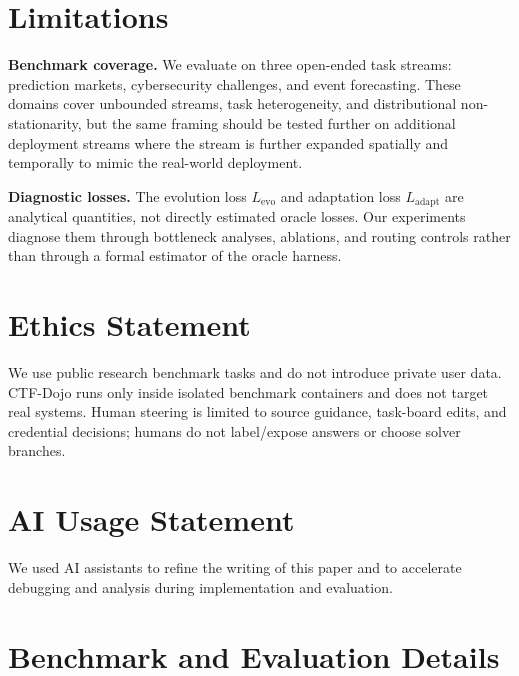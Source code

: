 \documentclass[11pt]{article}
\theoremstyle{plain}
\newcommand{\Levo}{L_{\text{evo}}}
\newcommand{\Ladapt}{L_{\text{adapt}}}
\begin{document}
\section{Limitations}
\label{sec:limitations}

\noindent\textbf{Benchmark coverage.}
We evaluate on three open-ended task streams: prediction markets, cybersecurity challenges, and event forecasting. These domains cover unbounded streams, task heterogeneity, and distributional non-stationarity, but the same framing should be tested further on additional deployment streams where the stream is further expanded spatially and temporally to mimic the real-world deployment.

\noindent\textbf{Diagnostic losses.}
The evolution loss $\Levo$ and adaptation loss $\Ladapt$ are analytical quantities, not directly estimated oracle losses. Our experiments diagnose them through bottleneck analyses, ablations, and routing controls rather than through a formal estimator of the oracle harness.




\section{Ethics Statement}
\label{sec:ethics}

We use public research benchmark tasks and do not introduce private user data. CTF-Dojo runs only inside isolated benchmark containers and does not target real systems. Human steering is limited to source guidance, task-board edits, and credential decisions; humans do not label/expose answers or choose solver branches.




\section{AI Usage Statement}
\label{sec:ai-usage}

We used AI assistants to refine the writing of this paper and to accelerate debugging and analysis during implementation and evaluation.




\appendix



\clearpage
\section{Benchmark and Evaluation Details}
\label{app:benchmarks}
\end{document}
